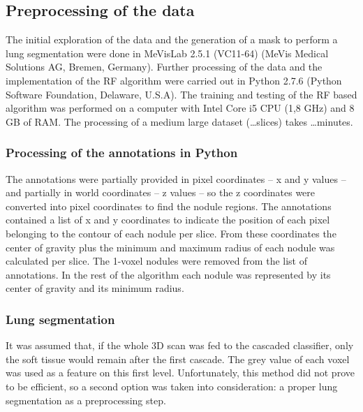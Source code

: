 \subsection{Preprocessing of the data}
The initial exploration of the data and the generation of a mask to perform a
lung segmentation were done in MeVisLab 2.5.1 (VC11-64) (MeVis Medical Solutions
AG, Bremen, Germany). Further processing of the data and the implementation of
the RF algorithm were carried out in Python 2.7.6 (Python Software Foundation,
Delaware, U.S.A).  The training and testing of the RF based algorithm was
performed on a computer with Intel Core i5 CPU (1,8 GHz) and 8 GB of RAM. The
processing of a medium large dataset (\ldots slices) takes \ldots minutes.

\subsubsection{Processing of the annotations in Python}
The annotations were partially provided in pixel coordinates -- x and y values
-- and partially in world coordinates -- z values -- so the z coordinates were
converted into pixel coordinates to find the nodule regions. The annotations
contained a list of x and y coordinates to indicate the position of each pixel
belonging to the contour of each nodule per slice. From these coordinates the
center of gravity plus the minimum and maximum radius of each nodule was
calculated per slice. The 1-voxel nodules were removed from the list of
annotations. In the rest of the algorithm each nodule was represented by its
center of gravity and its minimum radius.

\subsubsection{Lung segmentation}
It was assumed that, if the whole 3D scan was fed to the cascaded classifier,
only the soft tissue would remain after the first cascade. The grey value of
each voxel was used as a feature on this first level. Unfortunately, this method
did not prove to be efficient, so a second option was taken into consideration:
a proper lung segmentation as a preprocessing step.

